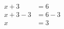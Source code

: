 \documentclass[varwidth]{standalone}
\begin{document}
    \begin{varwidth}{0.25\paperwidth}
    \begin{align*}
    x + 3 &= 6\\
    x + 3 - 3 &= 6 - 3\\
    x &= 3\\
\end{align*}
\end{varwidth}
\end{document}
